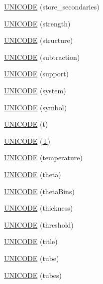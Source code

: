 \begin{DoxyCompactItemize}
\item 
\hyperlink{namespace_d_d4hep_1_1_x_m_l_a2c01c23fd0b2c71d55c935516e00fb0b}{U\+N\+I\+C\+O\+DE} (store\+\_\+secondaries)
\item 
\hyperlink{namespace_d_d4hep_1_1_x_m_l_a51b8b821c7c7382afe7d64ac1e2b6f54}{U\+N\+I\+C\+O\+DE} (strength)
\item 
\hyperlink{namespace_d_d4hep_1_1_x_m_l_abf3ada9748fe4fc5e7c446a45425b76a}{U\+N\+I\+C\+O\+DE} (structure)
\item 
\hyperlink{namespace_d_d4hep_1_1_x_m_l_a828a692e179626778ed33dc45049aa84}{U\+N\+I\+C\+O\+DE} (subtraction)
\item 
\hyperlink{namespace_d_d4hep_1_1_x_m_l_a615eeaf8af96a5d5e33bb326e78797ee}{U\+N\+I\+C\+O\+DE} (support)
\item 
\hyperlink{namespace_d_d4hep_1_1_x_m_l_a99cc902998e63431d33e375b133be60e}{U\+N\+I\+C\+O\+DE} (system)
\item 
\hyperlink{namespace_d_d4hep_1_1_x_m_l_ac099d1e5d54edbc9f71b3629ddf164f5}{U\+N\+I\+C\+O\+DE} (symbol)
\item 
\hyperlink{namespace_d_d4hep_1_1_x_m_l_a988d89cf2c203a2dcab17dcdd2b646e9}{U\+N\+I\+C\+O\+DE} (t)
\item 
\hyperlink{namespace_d_d4hep_1_1_x_m_l_ae77633b9569ec50bee3f73593ec8a980}{U\+N\+I\+C\+O\+DE} (\hyperlink{class_t}{T})
\item 
\hyperlink{namespace_d_d4hep_1_1_x_m_l_aee923e97c96d6ce85da79a35da8fc126}{U\+N\+I\+C\+O\+DE} (temperature)
\item 
\hyperlink{namespace_d_d4hep_1_1_x_m_l_a8b7e23c0e5c06deb75db701712e98cdd}{U\+N\+I\+C\+O\+DE} (theta)
\item 
\hyperlink{namespace_d_d4hep_1_1_x_m_l_a60d1fee6ef14e9212445fa1b817b0651}{U\+N\+I\+C\+O\+DE} (theta\+Bins)
\item 
\hyperlink{namespace_d_d4hep_1_1_x_m_l_a3ad9b853b7a648c289537417ea181ce7}{U\+N\+I\+C\+O\+DE} (thickness)
\item 
\hyperlink{namespace_d_d4hep_1_1_x_m_l_a43d8619360425e00275ea047bf584f64}{U\+N\+I\+C\+O\+DE} (threshold)
\item 
\hyperlink{namespace_d_d4hep_1_1_x_m_l_a8699fc9c08306eb74b113123266234bb}{U\+N\+I\+C\+O\+DE} (title)
\item 
\hyperlink{namespace_d_d4hep_1_1_x_m_l_a59d5c1db0e628670901c0aff664eb5c1}{U\+N\+I\+C\+O\+DE} (tube)
\item 
\hyperlink{namespace_d_d4hep_1_1_x_m_l_a80b1b709eb536f9107a7c7297b702c80}{U\+N\+I\+C\+O\+DE} (tubes)
\item 

\end{DoxyCompactItemize}
